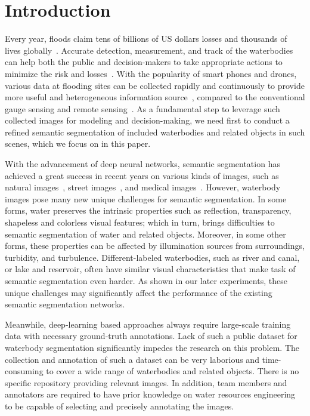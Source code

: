 \documentclass{article}
\begin{document}
\section{Introduction}
Every year, floods claim tens of billions of US dollars losses and thousands of lives globally~\cite{hirabayashi2013global}. Accurate detection, measurement, and track of the waterbodies can help both the public and decision-makers to take appropriate actions to minimize the risk and losses~\cite{huang2018near, gebrehiwot2019deep}. With the popularity of smart phones and drones, various data at flooding sites can be collected rapidly and continuously to provide more useful and heterogeneous information source~\cite{eltner2021using, eltner2018automatic, cervone2016using, schnebele2013improving}, compared to the conventional gauge sensing and remote sensing~\cite{eltner2021using, lo2015visual}. As a fundamental step to leverage such collected images for modeling and decision-making, we need first to conduct a refined semantic segmentation of included waterbodies and related objects in such scenes, which we focus on in this paper.

With the advancement of deep neural networks, semantic segmentation has achieved a great success in recent years on various kinds of images, such as natural images~\cite{lin2014microsoft}, street images~\cite{cordts2016Cityscapes, yu2020bdd100k}, and medical images~\cite{bernal2017comparative, jha2020kvasir}. However, waterbody images pose many new unique challenges for semantic segmentation. 
In some forms, water preserves the intrinsic properties such as reflection, transparency, shapeless and colorless visual features; which in turn, brings difficulties to semantic segmentation of water and related objects. Moreover, in some other forms, these properties can be affected by illumination sources from surroundings, turbidity, and turbulence. Different-labeled waterbodies, such as river and canal, or lake and reservoir, often have similar visual characteristics that make task of semantic segmentation even harder.
As shown in our later experiments, these unique challenges may significantly affect the performance of the existing semantic segmentation networks.

Meanwhile, deep-learning based approaches always require large-scale training data with necessary ground-truth annotations. Lack of such a public dataset for waterbody segmentation significantly impedes the research on this problem. The collection and annotation of such a dataset can be very laborious and time-consuming to cover a wide range of waterbodies and related objects. There is no specific repository providing relevant images. In addition, team members and annotators are required to have prior knowledge on water resources engineering to be capable of selecting and precisely annotating the images.
\end{document}
